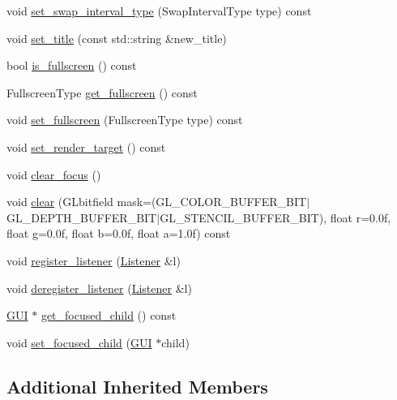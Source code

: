 \begin{DoxyCompactItemize}
\item 
void \mbox{\hyperlink{class_window_a86607cca316a63361a8e0546d7461496}{set\+\_\+swap\+\_\+interval\+\_\+type}} (Swap\+Interval\+Type type) const
\item 
void \mbox{\hyperlink{class_window_a56c2030999233ae438cb86229bbf1fa8}{set\+\_\+title}} (const std\+::string \&new\+\_\+title)
\item 
bool \mbox{\hyperlink{class_window_a2b9672924d8048d74098deeb4202dc76}{is\+\_\+fullscreen}} () const
\item 
Fullscreen\+Type \mbox{\hyperlink{class_window_aba76e9ee7a1fc05a26340154244bd967}{get\+\_\+fullscreen}} () const
\item 
void \mbox{\hyperlink{class_window_ae2ed6e396cf3dd2eb2636951192949cf}{set\+\_\+fullscreen}} (Fullscreen\+Type type) const
\item 
void \mbox{\hyperlink{class_window_a4d69ff4818898cd74241214183f404f9}{set\+\_\+render\+\_\+target}} () const
\item 
void \mbox{\hyperlink{class_window_a0df947eae50ea0565b4b5d826b94a394}{clear\+\_\+focus}} ()
\item 
void \mbox{\hyperlink{class_window_a8ad58be4ce5aec15ad590ce151d4776a}{clear}} (G\+Lbitfield mask=(G\+L\+\_\+\+C\+O\+L\+O\+R\+\_\+\+B\+U\+F\+F\+E\+R\+\_\+\+B\+IT$\vert$G\+L\+\_\+\+D\+E\+P\+T\+H\+\_\+\+B\+U\+F\+F\+E\+R\+\_\+\+B\+IT$\vert$G\+L\+\_\+\+S\+T\+E\+N\+C\+I\+L\+\_\+\+B\+U\+F\+F\+E\+R\+\_\+\+B\+IT), float r=0.\+0f, float g=0.\+0f, float b=0.\+0f, float a=1.\+0f) const
\item 
void \mbox{\hyperlink{class_window_ac5636a14c1078143a869821a07498cd5}{register\+\_\+listener}} (\mbox{\hyperlink{class_listener}{Listener}} \&l)
\item 
void \mbox{\hyperlink{class_window_a184dd18eea525b2d4f85a42e33681951}{deregister\+\_\+listener}} (\mbox{\hyperlink{class_listener}{Listener}} \&l)
\item 
\mbox{\hyperlink{class_g_u_i}{G\+UI}} $\ast$ \mbox{\hyperlink{class_window_af2f8beb54b28dc32d93f6b5f403d2152}{get\+\_\+focused\+\_\+child}} () const
\item 
void \mbox{\hyperlink{class_window_abed0ae68fac68c8d2191d4c7d7a82497}{set\+\_\+focused\+\_\+child}} (\mbox{\hyperlink{class_g_u_i}{G\+UI}} $\ast$child)
\end{DoxyCompactItemize}
\subsection*{Additional Inherited Members}


